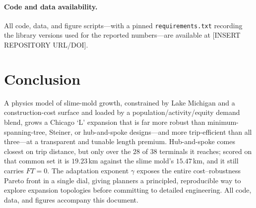 \documentclass[11pt]{article}
\begin{document}
\paragraph{Code and data availability.} All code, data, and figure scripts---with a pinned
\texttt{requirements.txt} recording the library versions used for the reported numbers---are
available at [INSERT REPOSITORY URL/DOI].

\section{Conclusion}
A physics model of slime-mold growth, constrained by Lake Michigan and a construction-cost
surface and loaded by a population/activity/equity demand blend, grows a Chicago `L' expansion
that is far more robust than minimum-spanning-tree, Steiner, or hub-and-spoke
designs---and more trip-efficient than all three---at a transparent and tunable
length premium.
Hub-and-spoke comes closest on trip distance, but only over the
$28$ of $38$ terminals it reaches; scored on that common set it is $19.23$\,km against
the slime mold's $15.47$\,km, and it still carries $FT=0$. The adaptation exponent $\gamma$ exposes the
entire cost--robustness Pareto front in a single dial, giving planners a principled, reproducible
way to explore expansion topologies before committing to detailed engineering. All code, data,
and figures accompany this document.
\end{document}
